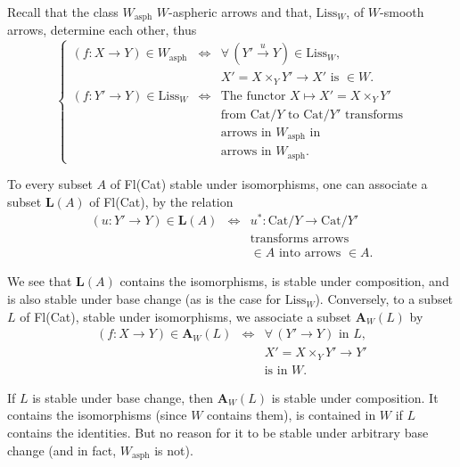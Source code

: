 
Recall that the class $W_{\mathrm{asph}}$ $W$-aspheric arrows and that, $\mathrm{Liss}_W$, of $W$-smooth arrows, determine each other, thus
\[
\left\{
\begin{array}{lcl}
(f : X \longrightarrow Y) \in W_{\mathrm{asph}} & \Longleftrightarrow & \forall\, (Y' \xrightarrow{\ u\ } Y) \in \mathrm{Liss}_W, \\
 & & X' = X \times_Y Y' \longrightarrow X' \text{ is } \in W. %
\\
(f : Y' \longrightarrow Y) \in \mathrm{Liss}_W & \Longleftrightarrow & \text{The functor } X \longmapsto X' = X \times_Y Y' \\
 & & \text{from } \mathrm{Cat}/Y \text{ to } \mathrm{Cat}/Y' \text{ transforms} \\
 & & \text{arrows in } W_{\mathrm{asph}} \text{ in} \\
 & & \text{arrows in } W_{\mathrm{asph}}.
\end{array}
\right.
\tag*{(4.10)}
\]

To every subset $A$ of Fl(Cat) stable under isomorphisms, one can associate a subset $\mathbf{L}(A)$ of Fl(Cat), by the relation
\[
\begin{array}{rcl}
(u : Y' \longrightarrow Y) \in \mathbf{L}(A) & \Longleftrightarrow & u^* : \mathrm{Cat}/Y \longrightarrow \mathrm{Cat}/Y' \\
 & & \text{transforms arrows} \\
 & & \in A \text{ into arrows } \in A.
\end{array}
\tag*{(4.11)}
\]

We see that $\mathbf{L}(A)$ contains the isomorphisms, is stable under composition, and is also stable under base change (as is the case for $\mathrm{Liss}_W$). Conversely, to a subset $L$ of Fl(Cat), stable under isomorphisms, we associate a subset $\mathbf{A}_W(L)$ by
\[
\begin{array}{rcl}
(f : X \longrightarrow Y) \in \mathbf{A}_W(L) & \Longleftrightarrow & \forall\, (Y' \longrightarrow Y) \text{ in } L, \\
 & & X' = X \times_Y Y' \longrightarrow Y' \\
 & & \text{is in } W.
\end{array}
\tag*{(4.12)}
\]

If $L$ is stable under base change, then $\mathbf{A}_W(L)$ is stable under composition. It contains the isomorphisms (since $W$ contains them), is contained in $W$ if $L$ contains the identities. But
no reason for it to be stable under arbitrary base change (and in fact, $W_{\mathrm{asph}}$ is not).

